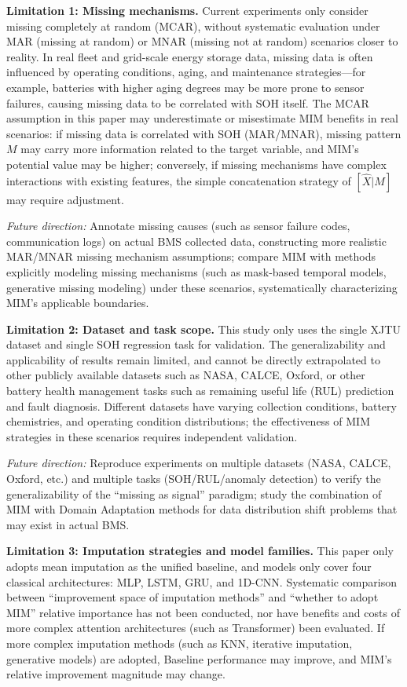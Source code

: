 \documentclass[10pt,a4paper]{article}
\begin{document}
\textbf{Limitation 1: Missing mechanisms.} Current experiments only consider missing completely at random (MCAR), without systematic evaluation under MAR (missing at random) or MNAR (missing not at random) scenarios closer to reality. In real fleet and grid-scale energy storage data, missing data is often influenced by operating conditions, aging, and maintenance strategies---for example, batteries with higher aging degrees may be more prone to sensor failures, causing missing data to be correlated with SOH itself. The MCAR assumption in this paper may underestimate or misestimate MIM benefits in real scenarios: if missing data is correlated with SOH (MAR/MNAR), missing pattern $M$ may carry more information related to the target variable, and MIM's potential value may be higher; conversely, if missing mechanisms have complex interactions with existing features, the simple concatenation strategy of $[\hat{X}|M]$ may require adjustment.

\textit{Future direction:} Annotate missing causes (such as sensor failure codes, communication logs) on actual BMS collected data, constructing more realistic MAR/MNAR missing mechanism assumptions; compare MIM with methods explicitly modeling missing mechanisms (such as mask-based temporal models, generative missing modeling) under these scenarios, systematically characterizing MIM's applicable boundaries.

\textbf{Limitation 2: Dataset and task scope.} This study only uses the single XJTU dataset and single SOH regression task for validation. The generalizability and applicability of results remain limited, and cannot be directly extrapolated to other publicly available datasets such as NASA, CALCE, Oxford, or other battery health management tasks such as remaining useful life (RUL) prediction and fault diagnosis. Different datasets have varying collection conditions, battery chemistries, and operating condition distributions; the effectiveness of MIM strategies in these scenarios requires independent validation.

\textit{Future direction:} Reproduce experiments on multiple datasets (NASA, CALCE, Oxford, etc.) and multiple tasks (SOH/RUL/anomaly detection) to verify the generalizability of the ``missing as signal'' paradigm; study the combination of MIM with Domain Adaptation methods for data distribution shift problems that may exist in actual BMS.

\textbf{Limitation 3: Imputation strategies and model families.} This paper only adopts mean imputation as the unified baseline, and models only cover four classical architectures: MLP, LSTM, GRU, and 1D-CNN. Systematic comparison between ``improvement space of imputation methods'' and ``whether to adopt MIM'' relative importance has not been conducted, nor have benefits and costs of more complex attention architectures (such as Transformer) been evaluated. If more complex imputation methods (such as KNN, iterative imputation, generative models) are adopted, Baseline performance may improve, and MIM's relative improvement magnitude may change.
\end{document}
